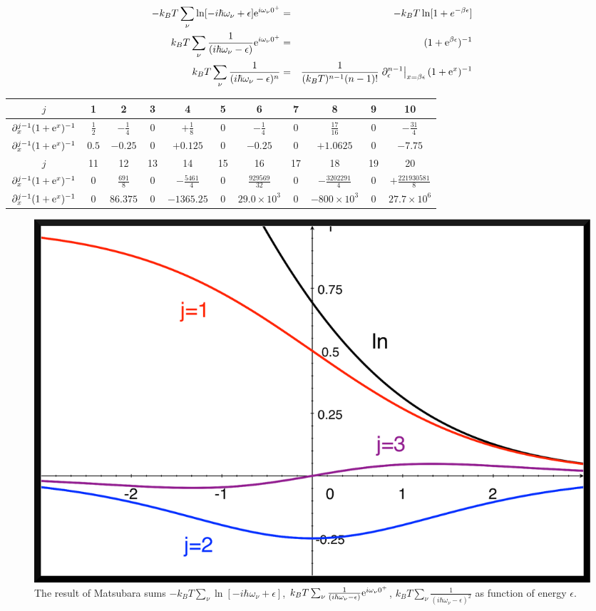 \documentclass[11pt,a4paper]{report}
\begin{document}
\begin{eqnarray}
-k_BT\sum_\nu\ln[-i\hbar\omega_\nu+\epsilon]\mathrm{e}^{i\omega_\nu0^+}
&=&-k_BT\ln[1+e^{-\beta \epsilon}]
\\
k_BT\sum_\nu \frac{1}{(i\hbar\omega_\nu-\epsilon)}\mathrm{e}^{i\omega_\nu 0^+}
&=&(1+\mathrm{e}^{\beta \epsilon})^{-1}
\\
k_BT\sum_\nu \frac{1}{(i\hbar\omega_\nu-\epsilon)^n}
&=&\frac{1}{(k_BT)^{n-1}(n-1)!}
\left.\partial_\epsilon^{n-1}\right|_{x=\beta\epsilon}(1+\mathrm{e}^{x})^{-1}
\end{eqnarray}
\begin{center}
\begin{tabular}{|c|c|c|c|c|c|c|c|c|c|c|}
\hline
$j$& 1 & 2 & 3 & 4 & 5 &6 &7 &8 & 9 & 10\\
\hline
$\partial^{j-1}_x(1+\mathrm{e}^{x})^{-1}$
&$\frac{1}{2}$ 
&$-\frac{1}{4}$ 
&$0$ 
&$+\frac{1}{8}$ 
&$0$ 
&$-\frac{1}{4}$ 
&$0$ 
&$\frac{17}{16}$
&$0$ 
&$-\frac{31}{4}$
\\
\hline
$\partial^{j-1}_x(1+\mathrm{e}^{x})^{-1}$
&$0.5$ 
&$-0.25$ 
&$0$ 
&$+0.125$ 
&$0$ 
&$-0.25$ 
&$0$ 
&$+1.0625$
&$0$ 
&$-7.75$
\\
\hline
\hline
$j$& 11 & 12 & 13 & 14 & 15 &16 &17 &18 & 19 & 20\\
\hline
$\partial^{j-1}_x(1+\mathrm{e}^{x})^{-1}$
&$0$ 
&$\frac{691}{8}$ 
&$0$ 
&$-\frac{5461}{4}$ 
&$0$ 
&$\frac{929569}{32}$ 
&$0$ 
&$-\frac{3202291}{4}$
&$0$ 
&$+\frac{221930581}{8}$
\\
\hline
$\partial^{j-1}_x(1+\mathrm{e}^{x})^{-1}$
&$0$ 
&$86.375$ 
&$0$ 
&$-1365.25$ 
&$0$ 
&$29.0\times10^3$ 
&$0$ 
&$-800\times10^3$
&$0$ 
&$27.7\times 10^6$ %
\\
\hline
\end{tabular}
\end{center}

\begin{figure}[h!]
\begin{center}
\includegraphics[width=0.8\linewidth,clip=true]
{Figs/Matsubarasums/matsubarasums1.eps}
\end{center}
\caption{\label{fig:matsubarasums} The result of Matsubara sums
  $-k_BT\sum_\nu\ln[-i\hbar\omega_\nu+\epsilon]$, $k_BT\sum_\nu
  \frac{1}{(i\hbar\omega_\nu-\epsilon)}\mathrm{e}^{i\omega_\nu 0^+}$,
$k_BT\sum_\nu \frac{1}{(i\hbar\omega_\nu-\epsilon)^2}$ as
  function of energy $\epsilon$.}
\end{figure}
\end{document}
